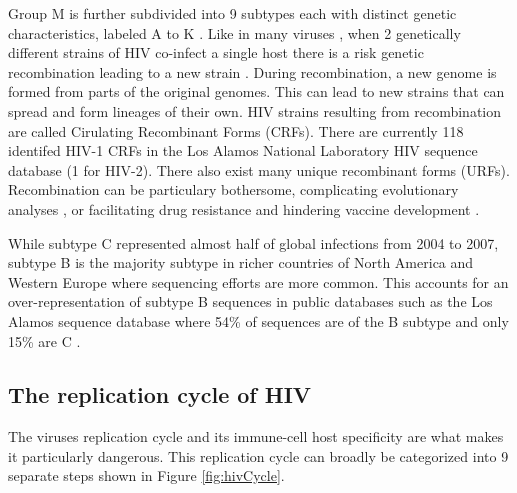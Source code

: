 \documentclass[
  11pt,
  twoside]{scrbook}
\begin{document}
Group M is further subdivided into 9 subtypes each with distinct genetic characteristics, labeled A to K \autocite{mccutchanGlobalEpidemiologyHIV2006,sharpOriginsHIVAIDS2011}. Like in many viruses \autocite{perez-losadaRecombinationVirusesMechanisms2015}, when 2 genetically different strains of HIV co-infect a single host there is a risk genetic recombination leading to a new strain \autocite{robertsonRecombinationAIDSViruses1995}. During recombination, a new genome is formed from parts of the original genomes. This can lead to new strains that can spread and form lineages of their own. HIV strains resulting from recombination are called Cirulating Recombinant Forms (CRFs). There are currently 118 identifed HIV-1 CRFs in the Los Alamos National Laboratory HIV sequence database \autocite{HIVCirculatingRecombinant} (1 for HIV-2). There also exist many unique recombinant forms (URFs). Recombination can be particulary bothersome, complicating evolutionary analyses \autocite{posadaRecombinationEvolutionaryGenomics2002}, or facilitating drug resistance and hindering vaccine development \autocite{taylorChallengeHIV1Subtype2008}.

While subtype C represented almost half of global infections from 2004 to 2007, subtype B is the majority subtype in richer countries of North America and Western Europe \autocite{hemelaarGlobalTrendsMolecular2011} where sequencing efforts are more common. This accounts for an over-representation of subtype B sequences in public databases such as the Los Alamos sequence database where 54\% of sequences are of the B subtype and only 15\% are C \autocite{DistributionAllHIV1}.

\hypertarget{the-replication-cycle-of-hiv}{%
\subsection{The replication cycle of HIV}\label{the-replication-cycle-of-hiv}}

The viruses replication cycle and its immune-cell host specificity are what makes it particularly dangerous. This replication cycle can broadly be categorized into 9 separate steps \autocite{freedHIV1Replication2001,fergusonHIV1ReplicationCycle2002} shown in Figure \ref{fig:hivCycle}.
\end{document}
